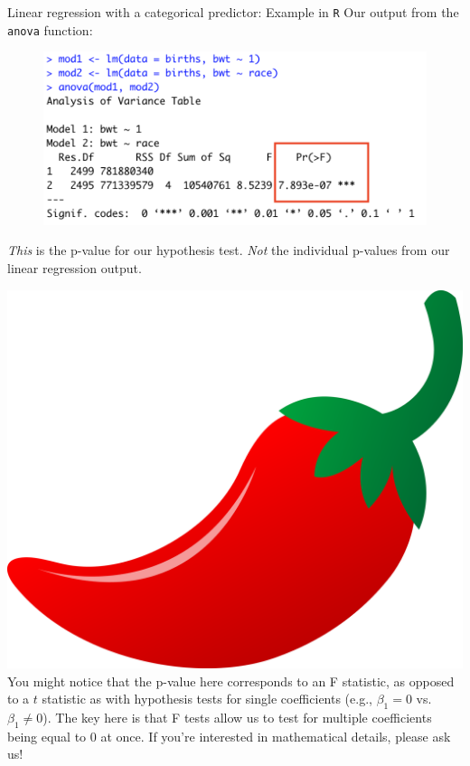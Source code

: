 \documentclass[10pt,t]{beamer}
\begin{document}
\begin{frame}{Linear regression with a categorical predictor: Example in \texttt{R}}
Our output from the \texttt{anova} function:

\vspace{0.3cm}

\begin{figure}
	\centering \includegraphics[scale=0.4]{anova_race2.png}
\end{figure}

\vspace{0.3cm}

\textit{This} is the p-value for our hypothesis test. \textit{Not} the individual p-values from our linear regression output. \pause

\vspace{0.3cm}


\includegraphics[scale=0.01]{chilipepper.png} \tiny You might notice that the p-value here corresponds to an F statistic, as opposed to a $t$ statistic as with hypothesis tests for single coefficients (e.g., $\beta_1 = 0$ vs. $\beta_1 \neq 0$). The key here is that F tests allow us to test for multiple coefficients being equal to $0$ at once. If you're interested in mathematical details, please ask us!

\end{frame}
\end{document}
